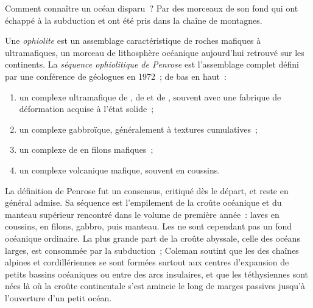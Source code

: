 Comment connaître un océan disparu~? Par des morceaux de son fond qui ont échappé à la
subduction et ont été pris dans la chaîne de montagnes.

\begin{definition}\label{def:b2:alpine-orogen:ophiolite}
Une \emph{ophiolite} est un assemblage caractéristique de roches mafiques à ultramafiques,
un morceau de lithosphère océanique aujourd'hui retrouvé sur les continents. La \emph{séquence ophiolitique de
Penrose} est l'assemblage complet défini par une conférence
de géologues en 1972~; de bas en haut~:
\begin{enumerate}
\item un complexe ultramafique de , de  et de , souvent avec une
fabrique de déformation acquise à l'état solide~;
\item un complexe gabbroïque, généralement à textures cumulatives~;
\item un complexe de  en filons mafiques~;
\item un complexe volcanique mafique, souvent en coussins.
\end{enumerate}
\end{definition}

La définition de Penrose fut un consensus, critiqué dès le départ, et reste en général admise.
Sa séquence est l'empilement de la croûte océanique et du manteau supérieur rencontré dans le
volume de première année~: laves en coussins,  en filons, gabbro, puis manteau. Les  ne sont cependant pas
un fond océanique ordinaire. La plus grande part de la croûte abyssale, celle des océans larges, est consommée par
la subduction~; Coleman soutint que les  des chaînes alpines et cordillériennes se sont formées surtout aux
centres d'expansion de petits bassins océaniques ou entre des arcs insulaires, et que les  téthysiennes
sont nées là où la croûte continentale s'est amincie le long de marges passives jusqu'à l'ouverture d'un petit
océan.

